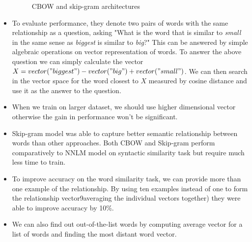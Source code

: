 \documentclass{article}
\begin{document}
\begin{itemize}
\begin{figure}[H]
        \caption{CBOW and skip-gram architectures}
        \label{fig:Figure 1}
    \end{figure}
    \item To evaluate performance, they denote two pairs of words with the same relationship as a question, asking "What is the word that is similar to \textit{small} in the same sense as \textit{biggest} is similar to \textit{big}?" This can be answered by simple algebraic operations on vector representation of words. To answer the above question we can simply calculate the vector $X=vector("biggest")-vector("big")+vector("small")$. We can then search in the vector space for the word closest to $X$ measured by cosine distance and use it as the answer to the question. 
    \item When we train on larger dataset, we should use higher dimensional vector otherwise the gain in performance won't be significant.
    \item Skip-gram model was able to capture better semantic relationship between words than other approaches. Both CBOW and Skip-gram perform comparatively to NNLM model on syntactic similarity task but require much less time to train.
    \item To improve accuracy on the word similarity task, we can provide more than one example of the relationship. By using ten examples instead of one to form the relationship vector9averaging the individual vectors together) they were able to improve accuracy by 10\%.
    \item We can also find out out-of-the-list words by computing average vector for a list of words and finding the most distant word vector.

\end{itemize}
\end{document}
